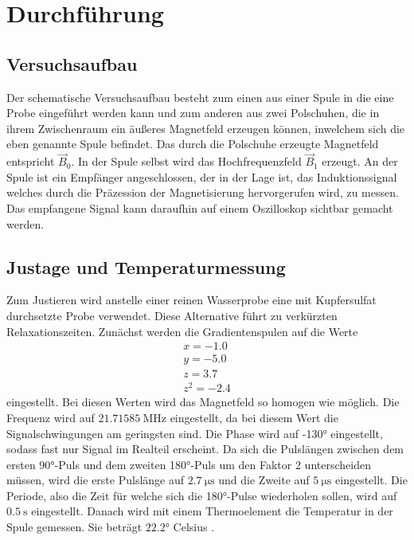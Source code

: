 \section{Durchführung}
\label{sec:Durchführung}

\subsection{Versuchsaufbau}
\label{sec:Versuchsaufbau}

Der schematische Versuchsaufbau besteht zum einen aus einer Spule in die eine Probe 
eingeführt 
werden kann und zum anderen aus zwei Polschuhen, die in ihrem Zwischenraum ein 
äußeres Magnetfeld erzeugen können, inwelchem sich die eben genannte Spule befindet. 
Das durch die Polschuhe erzeugte Magnetfeld entspricht $\vec{B}_{\text{0}}$.
In der Spule selbst wird das Hochfrequenzfeld $\vec{B}_{\text{1}}$ erzeugt.
An der Spule ist ein Empfänger angeschlossen, der in der Lage ist, das Induktionssignal 
welches durch die Präzession der Magnetisierung hervorgerufen wird, zu messen.
Das empfangene Signal kann daraufhin auf einem Oszilloskop sichtbar gemacht werden.

\subsection{Justage und Temperaturmessung}
\label{sec:Justage}

Zum Justieren wird anstelle einer reinen Wasserprobe eine mit Kupfersulfat 
durchsetzte Probe verwendet. Diese Alternative führt zu verkürzten Relaxationszeiten.
Zunächst werden die Gradientenspulen auf die Werte
\begin{align}
    x = -1.0\\
    y = -5.0\\
    z = 3.7\\
    z^2 = -2.4
\end{align}
eingestellt. Bei diesen Werten wird das Magnetfeld so homogen wie möglich.
Die Frequenz wird auf $\SI{21.71585}{\mega\hertz}$ eingestellt,
da bei diesem Wert die Signalschwingungen am geringsten sind. Die Phase wird auf 
-130° eingestellt, sodass fast nur Signal im Realteil erscheint.
Da sich die Pulslängen zwischen dem ersten 90°-Puls und dem zweiten 180°-Puls
um den Faktor 2 unterscheiden müssen, wird die 
erste Pulslänge auf $\SI{2.7}{\micro\second}$ und die Zweite auf 
$\SI{5}{\micro\second}$ eingestellt.
Die Periode, also die Zeit für welche sich die 180°-Pulse wiederholen sollen,
wird auf $\SI{0.5}{\second}$ eingestellt.
Danach wird mit einem Thermoelement die Temperatur in der Spule gemessen.
Sie beträgt $22.2$° Celsius \cite{anleitung}.

